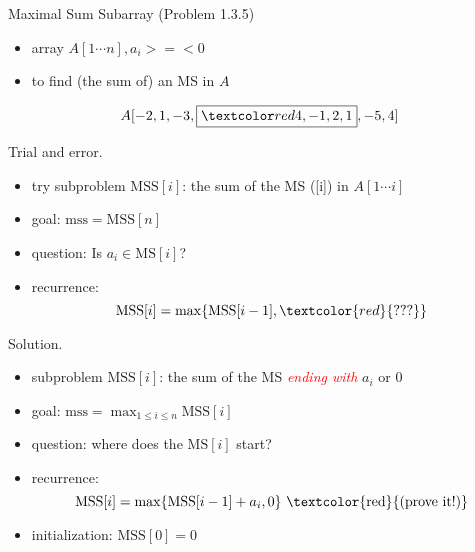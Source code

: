 
\begin{frame}{}
  \begin{exampleblock}{Maximal Sum Subarray (Problem 1.3.5)}
    \begin{itemize}
      \item array $A[1 \cdots n], a_{i} >=< 0$
      \item to find (the sum of) an MS in $A$
    \end{itemize}
	
    \[
      A[-2,1 ,-3, \boxed{\red{4,-1,2,1}} ,-5,4]
    \]
  \end{exampleblock}

  \pause
  \begin{alertblock}{Trial and error.}
    \begin{itemize}
      \item try subproblem $\text{MSS}[i]$: the sum of the MS ([i]) in $A[1 \cdots i]$
      \item goal: $\text{mss} = \text{MSS}[n]$
      \item question: Is $a_{i} \in \text{MS}[i]$?
      \item recurrence: 
	\[ 
	  \text{MSS}[i] = \max \set{\text{MSS}[i-1], \textcolor{red}{???}}
	\]
    \end{itemize}
  \end{alertblock}
\end{frame}
\begin{frame}{}
  \begin{block}{Solution.}
    \begin{itemize}
      \item subproblem $\text{MSS}[i]$: the sum of the MS \textcolor{red}{\it ending with} $a_{i}$ or 0
      \item goal: $\text{mss} = \max_{1 \le i \le n} \text{MSS}[i]$
      \item<2-> question: where does the $\text{MS}[i]$ start?
      \item<3-> recurrence: 
	\[ 
	  \text{MSS}[i] = \max \set{\text{MSS}[i-1] + a_{i}, 0} \text{ \textcolor{red}{(prove it!)}}
	\]
      \item<4-> initialization: $\text{MSS}[0] = 0$
    \end{itemize}

  \end{block}
\end{frame}
\begin{frame}{}
  

  \pause
  \vspace{-0.30cm}
  
\end{frame}
